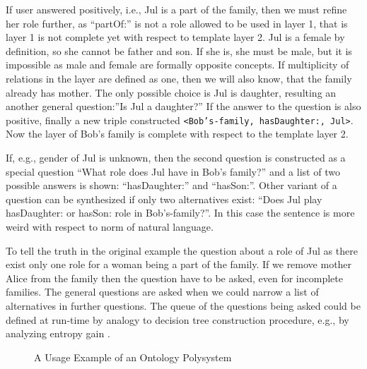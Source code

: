 \documentclass[conference]{IEEEtran}
\begin{document}
If user answered positively, i.e., Jul is a part of the family, then
we must refine her role further, as ``partOf:'' is not a role allowed
to be used in layer 1, that is layer 1 is not complete yet with
respect to template layer 2.  Jul is a female by definition, so she
cannot be father and son.  If she is, she must be male, but it is
impossible as male and female are formally opposite concepts.  If
multiplicity of relations in the layer are defined as one, then we
will also know, that the family already has mother.  The only possible
choice is Jul is daughter, resulting an another general question:''Is
Jul a daughter?''  If the answer to the question is also positive,
finally a new triple constructed \texttt{<Bob's-family, hasDaughter:,
  Jul>}.  Now the layer of Bob's family is complete with respect to
the template layer 2.

If, e.g., gender of Jul is unknown, then the second question is
constructed as a special question ``What role does Jul have in Bob's
family?'' and a list of two possible answers is shown:
``hasDaughter:'' and ``hasSon:''.  Other variant of a question can be
synthesized if only two alternatives exist: ``Does Jul play
hasDaughter: or hasSon: role in Bob's-family?''.  In this case the
sentence is more weird with respect to norm of natural language.

To tell the truth in the original example the question about a role of
Jul as there exist only one role for a woman being a part of the
family.  If we remove mother Alice from the family then the question
have to be asked, even for incomplete families.  The general questions
are asked when we could narrow a list of alternatives in further
questions.  The queue of the questions being asked could be defined at
run-time by analogy to decision tree construction procedure, e.g., by
analyzing entropy gain \cite{dectrees}.

\begin{figure}
\centering\footnotesize\sf
\def\svgwidth{0.9\linewidth}

\caption{A Usage Example of an Ontology Polysystem}
\label{OPSA}
\end{figure}





\end{document}
